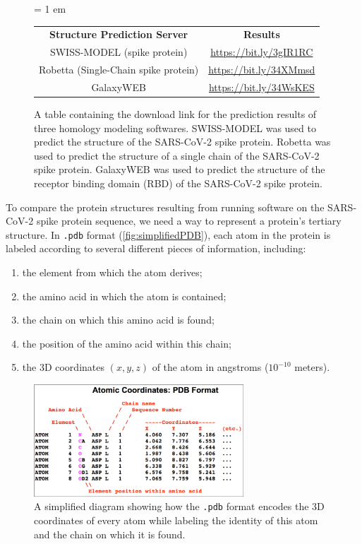 \begin{figure}[h]
	\centering
	\tabcolsep = 1 em
	\mySfFamily
	\begin{tabular}{c c}
		\textbf{Structure Prediction Server} & \textbf{Results} \\
		SWISS-MODEL (spike protein) & \url{https://bit.ly/3gIR1RC} \\
		Robetta (Single-Chain spike protein) & \url{https://bit.ly/34XMmsd} \\
		GalaxyWEB & \url{https://bit.ly/34WsKES} \\
	\end{tabular}
	\caption{A table containing the download link for the prediction results of three homology modeling softwares. SWISS-MODEL was used to predict the structure of the SARS-CoV-2 spike protein. Robetta was used to predict the structure of a single chain of the SARS-CoV-2 spike protein. GalaxyWEB was used to predict the structure of the receptor binding domain (RBD) of the SARS-CoV-2 spike protein.}
	\label{fig:homology_modeling_results_table}
\end{figure}

To compare the protein structures resulting from running software on the SARS-CoV-2 spike protein sequence, we need a way to represent a protein's tertiary structure. In \texttt{.pdb} format (\autoref{fig:simplifiedPDB}), each atom in the protein is labeled according to several different pieces of information, including:

\begin{enumerate}
	\item the element from which the atom derives;
	\item the amino acid in which the atom is contained;
	\item the chain on which this amino acid is found;
	\item the position of the amino acid within this chain;
	\item the 3D coordinates $(x, y, z)$ of the atom in angstroms ($10^{-10}$ meters).
\end{enumerate}

\begin{figure}[h]
	\centering
	\mySfFamily
	\includegraphics[width = 0.7\textwidth]{../images/simplifiedPDB.png}
	\caption{A simplified diagram showing how the \texttt{.pdb} format encodes the 3D coordinates of every atom while labeling the identity of this atom and the chain on which it is found.}
	\label{fig:simplifiedPDB}
\end{figure}

